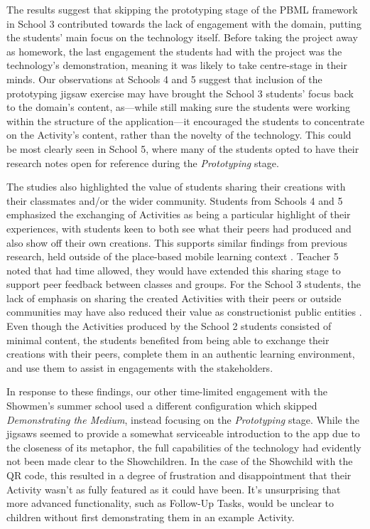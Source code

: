 The results suggest that skipping the prototyping stage of the PBML framework in School 3 contributed towards the lack of engagement with the domain, putting the students' main focus on the technology itself. Before taking the project away as homework, the last engagement the students had with the project was the technology's demonstration, meaning it was likely to take centre-stage in their minds. Our observations at Schools 4 and 5 suggest that inclusion of the prototyping jigsaw exercise may have brought the School 3 students' focus back to the domain's content, as---while still making sure the students were working within the structure of the application---it encouraged the students to concentrate on the Activity's content, rather than the novelty of the technology. This could be most clearly seen in School 5, where many of the students opted to have their research notes open for reference during the \textit{Prototyping} stage.

The studies also highlighted the value of students sharing their creations with their classmates and/or the wider community. Students from Schools 4 and 5 emphasized the exchanging of Activities as being a particular highlight of their experiences, with students keen to both see what their peers had produced and also show off their own creations. This supports similar findings from previous research, held outside of the place-based mobile learning context \citep{Sarangapani2018, Heslop2017}. Teacher 5 noted that had time allowed, they would have extended this sharing stage to support peer feedback between classes and groups. For the School 3 students, the lack of emphasis on sharing the created Activities with their peers or outside communities may have also reduced their value as constructionist public entities \citep{Papert1991}. Even though the Activities produced by the School 2 students consisted of minimal content, the students benefited from being able to exchange their creations with their peers, complete them in an authentic learning environment, and use them to assist in engagements with the stakeholders.

In response to these findings, our other time-limited engagement with the Showmen's summer school used a different configuration which skipped \textit{Demonstrating the Medium}, instead focusing on the \textit{Prototyping} stage. While the jigsaws seemed to provide a somewhat serviceable introduction to the app due to the closeness of its metaphor, the full capabilities of the technology had evidently not been made clear to the Showchildren. In the case of the Showchild with the QR code, this resulted in a degree of frustration and disappointment that their Activity wasn't as fully featured as it could have been. It's unsurprising that more advanced functionality, such as Follow-Up Tasks, would be unclear to children without first demonstrating them in an example Activity.


